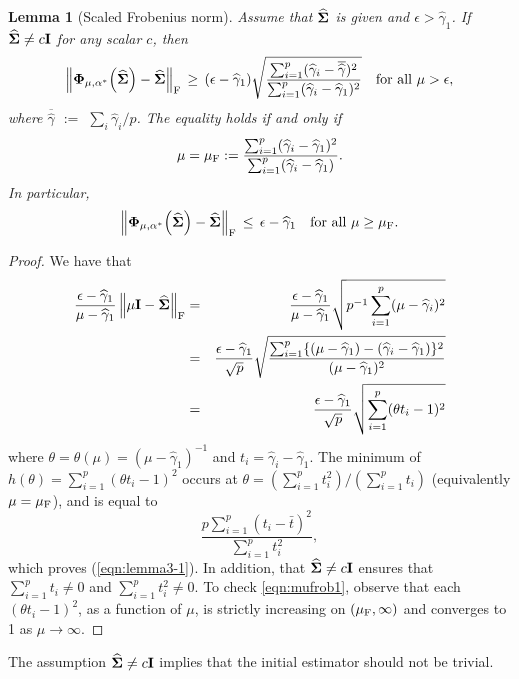 \documentclass[times,sort&compress,3p]{elsarticle}
\newcommand{\NN}{\nonumber}
\newtheorem{lemma}{Lemma}
\begin{document}
\begin{lemma}[Scaled Frobenius norm]\label{lemma:mufrob} Assume that $\widehat{\bf \Sigma}$ is given and $\epsilon > \widehat{\gamma}_{1}$. If $\widehat{\bf \Sigma} \neq c {\bf I}$ for any scalar $c$, then
\begin{equation}\label{eqn:lemma3-1}
\left\| {\bf \Phi}_{\mu, \alpha^*}\Big(\widehat{\bf \Sigma}\Big) 
	- \widehat{\bf \Sigma} \right\|_{\rm F}
\,\geq\, (\epsilon - \widehat{\gamma}_{1}) 
 \sqrt{\frac{\sum_{i=1}^p ({\widehat{\gamma}}_i - {\overline{\widehat{\gamma}}})^2}{\sum_{i=1}^p ({\widehat{\gamma}}_i - {\widehat{\gamma}}_1)^2} } 
~~\mbox{ for all $\mu > \epsilon$},
\end{equation}
where ${\overline{\widehat{\gamma}}}$ $:=$ $\sum_i \widehat{\gamma}_i / p$.
The equality holds if and only if
\[
\mu= \mu_{\rm F} :=\frac{\sum_{i=1}^p ({\widehat{\gamma}}_i - {\widehat{\gamma}}_1)^2}{\sum_{i=1}^p ({\widehat{\gamma}}_i - {\widehat{\gamma}}_1)}.
\]
In particular,
\begin{equation}\label{eqn:mufrob1}
\left\| {\bf \Phi}_{\mu, \alpha^*}\Big(\widehat{\bf \Sigma}\Big) 
	- \widehat{\bf \Sigma} \right\|_{\rm F}
\,\leq\, \epsilon - \widehat{\gamma}_{1} ~~\mbox{ for all }\mu \geq \mu_{\rm F}.
\end{equation}
\end{lemma}
%
\begin{proof}%
We have that
\begin{eqnarray}
\frac{\epsilon - \widehat{\gamma}_{1}}{\mu - \widehat{\gamma}_{1}} \left\|   \mu {\bf I} - \widehat{\bf \Sigma}  \right\|_{\rm F}
&=&
\frac{\epsilon - \widehat{\gamma}_{1}}{\mu - \widehat{\gamma}_{1}} 
\sqrt{ p^{-1}\sum_{i=1}^p (\mu - {\widehat{\gamma}}_i)^2 } \NN \\
&=&  \frac{\epsilon - \widehat{\gamma}_{1}}{\sqrt{p}} 
\sqrt{ \frac{\sum_{i=1}^p \{(\mu -{\widehat{\gamma}}_1) - ( {\widehat{\gamma}}_i - {\widehat{\gamma}}_1)\}^2}{ (\mu - \widehat{\gamma}_{1})^2} } \NN \\
&=&  \frac{\epsilon - \widehat{\gamma}_{1}}{\sqrt{p}} 
\sqrt{\sum_{i=1}^p (\theta t_i - 1)^2 } \NN
\end{eqnarray}
%
where $\theta = \theta(\mu) = (\mu - {\widehat{\gamma}}_1)^{-1}$ and $t_i = {\widehat{\gamma}}_i - {\widehat{\gamma}}_1$.
The minimum of $h(\theta)  = \sum_{i=1}^p (\theta t_i - 1)^2$ occurs at $\theta = (\sum_{i=1}^p t_i^2)/(\sum_{i=1}^p t_i)$  (equivalently $\mu = \mu_{\rm F}$), and is equal to 
\[
\frac{p\sum_{i=1}^p (t_i - {\bar{t}})^2}{\sum_{i=1}^p t_i^2},
\] 
which proves (\ref{eqn:lemma3-1}). In addition, that $\widehat{\bf \Sigma} \neq c {\bf I}$ ensures that $\sum_{i=1}^p t_i \neq 0$ and $\sum_{i=1}^p t_i^2 \neq 0$. 
To check \eqref{eqn:mufrob1}, observe that each $(\theta t_i - 1)^2$, as a function of $\mu$, is strictly increasing on $(\mu_{\rm F}, \infty)$  and converges to 1 as $\mu \rightarrow \infty$.
\end{proof}
\noindent The assumption $\widehat{\bf \Sigma} \neq c {\bf I}$ implies that the initial estimator should not be trivial.
\end{document}
